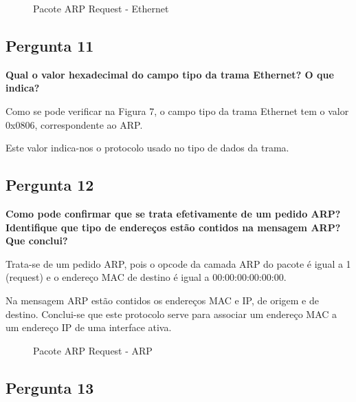 \documentclass[11pt]{article}
\begin{document}
\begin{figure}[hbt!]
    \centering
    \caption{Pacote ARP Request - Ethernet}
\end{figure}

\subsection{Pergunta 11}

\textbf{Qual o valor hexadecimal do campo tipo da trama Ethernet? O que indica?}

Como se pode verificar na Figura 7, o campo tipo da trama Ethernet tem o valor 0x0806, correspondente ao ARP.

Este valor indica-nos o protocolo usado no tipo de dados da trama.

\subsection{Pergunta 12}

\textbf{Como pode confirmar que se trata efetivamente de um pedido ARP? Identifique que tipo de endereços estão contidos na mensagem ARP? Que conclui?}

Trata-se de um pedido ARP, pois o opcode da camada ARP do pacote é igual a 1 (request) e o endereço MAC de destino é igual a 00:00:00:00:00:00.

Na mensagem ARP estão contidos os endereços MAC e IP, de origem e de destino. Conclui-se que este protocolo serve para associar um endereço MAC a um endereço IP de uma interface ativa.

\begin{figure}[hbt!]
    \centering
    \caption{Pacote ARP Request - ARP}
\end{figure}

\subsection{Pergunta 13}
\end{document}
